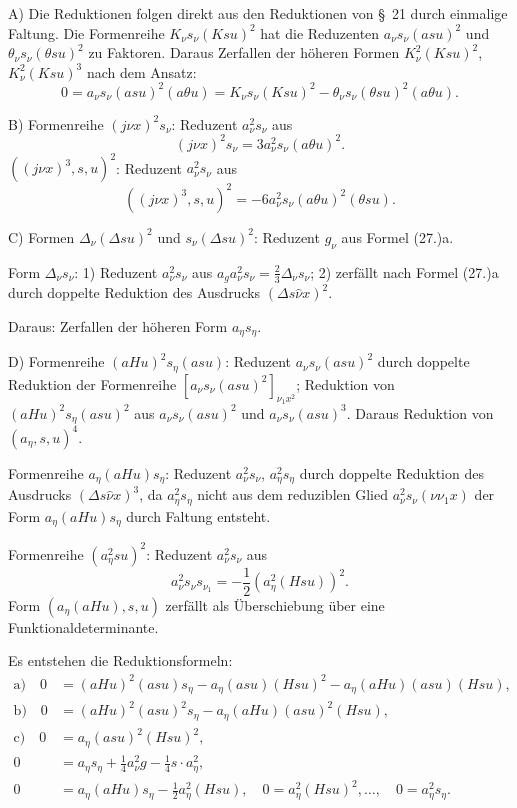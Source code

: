 \documentclass[11pt]{article}
\newcommand{\A}{\Delta}
\begin{document}
A) Die Reduktionen folgen direkt aus den Reduktionen von \S\ 21 durch einmalige Faltung. Die Formenreihe $K_\nu s_\nu(Ksu)^2$ hat die Reduzenten $a_\nu s_\nu(asu)^2$ und $\theta_\nu s_\nu(\theta su)^2$ zu Faktoren. Daraus Zerfallen der höheren Formen $K_\nu^2(Ksu)^2$, $K_\nu^2(Ksu)^3$ nach dem Ansatz:
\[
0=a_\nu s_\nu(asu)^2(a\theta u)=K_\nu s_\nu(Ksu)^2-\theta_\nu s_\nu(\theta su)^2(a\theta u).
\]

B) Formenreihe $(j\nu x)^2s_\nu$: Reduzent $a_\nu^2s_\nu$ aus
\[
(j\nu x)^2s_\nu=3a_\nu^2s_\nu(a\theta u)^2.
\]
$((j\nu x)^3,s,u)^2$: Reduzent $a_\nu^2s_\nu$ aus
\[
((j\nu x)^3,s,u)^2=-6a_\nu^2s_\nu(a\theta u)^2(\theta su).
\]

C) Formen $\A_\nu(\A su)^2$ und $s_\nu(\A su)^2$: Reduzent $g_\nu$ aus Formel (27.)a.

Form $\A_\nu s_\nu$:
1) Reduzent $a_\nu^2s_\nu$ aus $a_g a_\nu^2s_\nu=\frac23\A_\nu s_\nu$;
2) zerfällt nach Formel (27.)a durch doppelte Reduktion des Ausdrucks $(\A s\widehat\nu x)^2$.

Daraus: Zerfallen der höheren Form $a_\eta s_\eta$.

D) Formenreihe $(aHu)^2s_\eta(asu)$: Reduzent $a_\nu s_\nu(asu)^2$ durch doppelte Reduktion der Formenreihe $[a_\nu s_\nu(asu)^2]_{\nu_1x^2}$; Reduktion von $(aHu)^2s_\eta(asu)^2$ aus $a_\nu s_\nu(asu)^2$ und $a_\nu s_\nu(asu)^3$. Daraus Reduktion von $(a_\eta,s,u)^4$.

Formenreihe $a_\eta(aHu)s_\eta$: Reduzent $a_\nu^2s_\nu$, $a_\eta^2s_\eta$ durch doppelte Reduktion des Ausdrucks $(\A s\widehat\nu x)^3$, da $a_\eta^2s_\eta$ nicht aus dem reduziblen Glied $a_\nu^2s_\nu(\nu\nu_1x)$ der Form $a_\eta(aHu)s_\eta$ durch Faltung entsteht.

Formenreihe $(a_\eta^2su)^2$: Reduzent $a_\nu^2s_\nu$ aus
\[
a_\nu^2s_\nu s_{\nu_1}=-\frac12(a_\eta^2(Hsu))^2.
\]
Form $(a_\eta(aHu),s,u)$ zerfällt als Überschiebung über eine Funktionaldeterminante.

Es entstehen die Reduktionsformeln:
\[
\tag{30}
\begin{aligned}
\text{a)}\quad 0&=(aHu)^2(asu)s_\eta-a_\eta(asu)(Hsu)^2-a_\eta(aHu)(asu)(Hsu),\\
\text{b)}\quad 0&=(aHu)^2(asu)^2s_\eta-a_\eta(aHu)(asu)^2(Hsu),\\
\text{c)}\quad 0&=a_\eta(asu)^2(Hsu)^2,\\
0&=a_\eta s_\eta+\frac14a_\nu^2g-\frac14s\cdot a_\eta^2,\\
0&=a_\eta(aHu)s_\eta-\frac12a_\eta^2(Hsu),
\quad 0=a_\eta^2(Hsu)^2,\ldots,
\quad 0=a_\eta^2s_\eta.
\end{aligned}
\]
\end{document}
